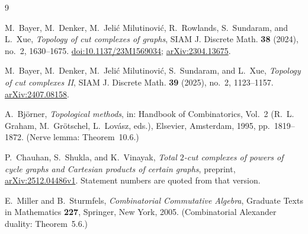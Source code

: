 \documentclass[11pt]{amsart}
\begin{document}
\begin{thebibliography}{9}

M.~Bayer, M.~Denker, M.~Jeli\'c Milutinovi\'c, R.~Rowlands, S.~Sundaram, and L.~Xue,
\emph{Topology of cut complexes of graphs},
SIAM J. Discrete Math. \textbf{38} (2024), no.~2, 1630--1675.
\href{https://doi.org/10.1137/23M1569034}{doi:10.1137/23M1569034};
\href{https://arxiv.org/abs/2304.13675}{arXiv:2304.13675}.

M.~Bayer, M.~Denker, M.~Jeli\'c Milutinovi\'c, S.~Sundaram, and L.~Xue,
\emph{Topology of cut complexes II},
SIAM J. Discrete Math. \textbf{39} (2025), no.~2, 1123--1157.
\href{https://arxiv.org/abs/2407.08158}{arXiv:2407.08158}.

A.~Bj\"orner,
\emph{Topological methods},
in: Handbook of Combinatorics, Vol.~2 (R.~L. Graham, M.~Gr\"otschel, L.~Lov\'asz, eds.),
Elsevier, Amsterdam, 1995, pp.~1819--1872. (Nerve lemma: Theorem~10.6.)

P.~Chauhan, S.~Shukla, and K.~Vinayak,
\emph{Total $2$-cut complexes of powers of cycle graphs and Cartesian products of certain graphs},
preprint, \href{https://arxiv.org/abs/2512.04486v1}{arXiv:2512.04486v1}.
Statement numbers are quoted from that version.

E.~Miller and B.~Sturmfels,
\emph{Combinatorial Commutative Algebra},
Graduate Texts in Mathematics \textbf{227}, Springer, New York, 2005.
(Combinatorial Alexander duality: Theorem~5.6.)

\end{thebibliography}
\end{document}
